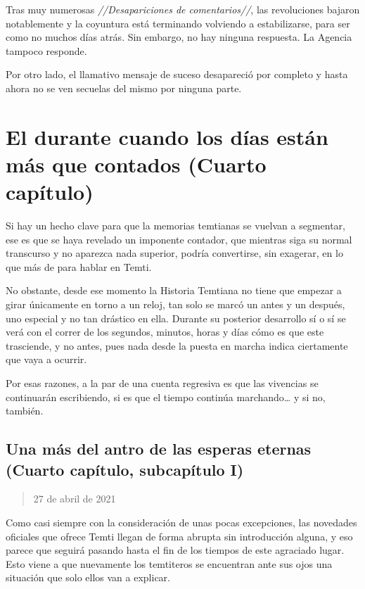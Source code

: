 \documentclass[
  spanish,
]{book}
\begin{document}
Tras muy numerosas \emph{//Desapariciones de comentarios//}, las revoluciones bajaron notablemente y la coyuntura está terminando volviendo a estabilizarse, para ser como no muchos días atrás. Sin embargo, no hay ninguna respuesta. La Agencia tampoco responde.

Por otro lado, el llamativo mensaje de suceso desapareció por completo y hasta ahora no se ven secuelas del mismo por ninguna parte.

\hypertarget{el-durante-cuando-los-duxedas-estuxe1n-muxe1s-que-contados-cuarto-capuxedtulo}{%
\chapter{El durante cuando los días están más que contados (Cuarto capítulo)}\label{el-durante-cuando-los-duxedas-estuxe1n-muxe1s-que-contados-cuarto-capuxedtulo}}

Si hay un hecho clave para que la memorias temtianas se vuelvan a segmentar, ese es que se haya revelado un imponente contador, que mientras siga su normal transcurso y no aparezca nada superior, podría convertirse, sin exagerar, en lo que más de para hablar en Temti.

No obstante, desde ese momento la Historia Temtiana no tiene que empezar a girar únicamente en torno a un reloj, tan solo se marcó un antes y un después, uno especial y no tan drástico en ella. Durante su posterior desarrollo sí o sí se verá con el correr de los segundos, minutos, horas y días cómo es que este trasciende, y no antes, pues nada desde la puesta en marcha indica ciertamente que vaya a ocurrir.

Por esas razones, a la par de una cuenta regresiva es que las vivencias se continuarán escribiendo, si es que el tiempo continúa marchando\ldots{} y si no, también.

\hypertarget{una-muxe1s-del-antro-de-las-esperas-eternas-cuarto-capuxedtulo-subcapuxedtulo-i}{%
\section{Una más del antro de las esperas eternas (Cuarto capítulo, subcapítulo I)}\label{una-muxe1s-del-antro-de-las-esperas-eternas-cuarto-capuxedtulo-subcapuxedtulo-i}}

\begin{quote}
27 de abril de 2021
\end{quote}

Como casi siempre con la consideración de unas pocas excepciones, las novedades oficiales que ofrece Temti llegan de forma abrupta sin introducción alguna, y eso parece que seguirá pasando hasta el fin de los tiempos de este agraciado lugar. Esto viene a que nuevamente los temtiteros se encuentran ante sus ojos una situación que solo ellos van a explicar.
\end{document}
